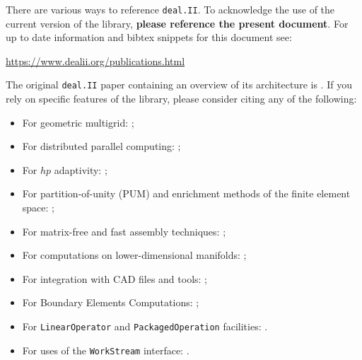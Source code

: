 \documentclass{ansarticle-preprint}
\newcommand{\specialword}[1]{\texttt{#1}}
\newcommand{\dealii}{{\specialword{deal.II}}\xspace}
\begin{document}
There are various ways to reference \dealii. To acknowledge the use of
the current version of the library, \textbf{please reference the present
document}. For up to date information and bibtex snippets for this document
see:
\begin{center}
 \url{https://www.dealii.org/publications.html}
\end{center}

The original \texttt{\dealii} paper containing an overview of its
architecture is \cite{BangerthHartmannKanschat2007}. If you rely on
specific features of the library, please consider citing any of the
following:
\begin{itemize}
 \item For geometric multigrid: \cite{Kanschat2004,JanssenKanschat2011};
 \item For distributed parallel computing: \cite{BangerthBursteddeHeisterKronbichler11};
 \item For $hp$ adaptivity: \cite{BangerthKayserHerold2007};
  \item For partition-of-unity (PUM) and enrichment methods of the
    finite element space: \cite{Davydov2016};
 \item For matrix-free and fast assembly techniques:
   \cite{KronbichlerKormann2012};
 \item For computations on lower-dimensional manifolds:
   \cite{DeSimoneHeltaiManigrasso2009};
 \item For integration with CAD files and tools:
   \cite{HeltaiMola2015};
 \item For Boundary Elements Computations:
   \cite{GiulianiMolaHeltai-2018-a};
 \item For \texttt{LinearOperator} and \texttt{PackagedOperation} facilities:
   \cite{MaierBardelloniHeltai-2016-a,MaierBardelloniHeltai-2016-b}.
 \item For uses of the \texttt{WorkStream} interface:
   \cite{TKB16}.
\end{itemize}
\end{document}
